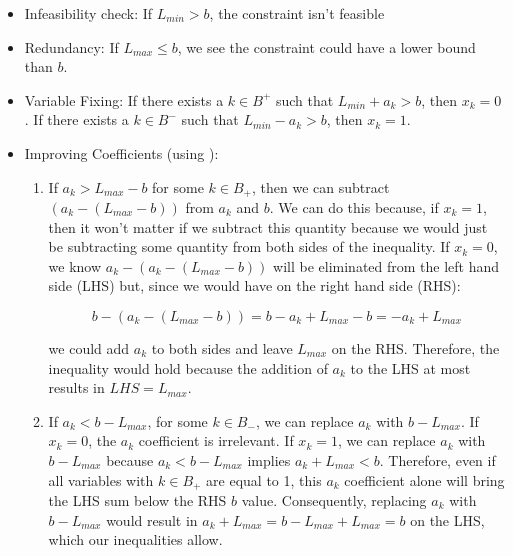 \documentclass[11pt]{article}
\begin{document}
\begin{enumerate}
\begin{itemize}

\item Infeasibility check: If $L_{min} > b$, the constraint isn't feasible

\item Redundancy: If $L_{max} \leq b$, we see the constraint could have a lower bound than $b$.

\item Variable Fixing: If there exists a $k \in B^{+}$ such that $L_{min} + a_{k} > b$, then $x_{k} = 0$.  If there exists a $k \in B^{-}$ such that $L_{min} - a_{k} > b$, then $x_{k} = 1$.

\item Improving Coefficients (using \cite{IP_textbook,savelsbergh1994preprocessing}): 

\begin{enumerate}

\item If $a_{k} > L_{max} - b$ for some $k \in B_{+}$, then we can subtract $(a_{k} - (L_{max} - b) )$ from $a_{k}$ and $b$.  We can do this because, if $x_{k} = 1$, then it won't matter if we subtract this quantity because we would just be subtracting some quantity from both sides of the inequality.  If $x_{k} = 0$, we know $a_{k} - (a_{k} - (L_{max} - b) )$ will be eliminated from the left hand side (LHS) but, since we would have on the right hand side (RHS):

\[ b - (a_{k} - (L_{max} - b)) = b - a_{k} + L_{max} - b = -a_{k} + L_{max} \]

\noindent we could add $a_{k}$ to both sides and leave $L_{max}$ on the RHS.  Therefore, the inequality would hold because the addition of $a_{k}$ to the LHS at most results in $LHS = L_{max}$.

\item If $a_{k} < b - L_{max}$, for some $k \in B_{-}$, we can replace $a_{k}$ with $b - L_{max}$.  If $x_{k} = 0$, the $a_{k}$ coefficient is irrelevant.  If $x_{k} = 1$, we can replace $a_{k}$ with $b - L_{max}$ because $a_{k} < b - L_{max}$ implies $a_{k} + L_{max} < b$.  Therefore, even if all variables with $k \in B_{+}$ are equal to 1, this $a_{k}$ coefficient alone will bring the LHS sum below the RHS $b$ value.  Consequently, replacing $a_{k}$ with $b - L_{max}$ would result in $a_{k} + L_{max} = b - L_{max} + L_{max} = b$ on the LHS, which our inequalities allow.  




\end{enumerate}
\end{itemize}



\end{enumerate}
\end{document}
